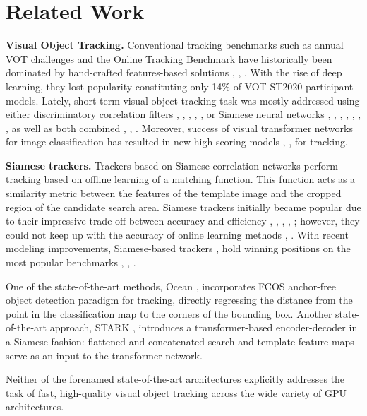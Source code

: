 \documentclass[runningheads]{llncs}
\begin{document}
\section{Related Work}
\textbf{Visual Object Tracking.}
Conventional tracking benchmarks such as annual VOT challenges \cite{VOT} and the Online Tracking Benchmark \cite{OTB} have historically been dominated by hand-crafted features-based solutions \cite{Matas}, \cite{KCF}, \cite{Staple}.
With the rise of deep learning, they lost popularity constituting only 14\% of VOT-ST2020 \cite{VOT2020} participant models.
Lately, short-term visual object tracking task \cite{VOT2020} was mostly addressed using either discriminatory correlation filters \cite{ECO}, \cite{DiMP}, \cite{ATOM}, \cite{DCFST}, \cite{LADCF}, \cite{AFOD} or Siamese neural networks \cite{Ocean}, \cite{SiamRPN}, \cite{SiamRPN++}, \cite{DaSiamRPN}, \cite{SiamFC++}, \cite{SiamDW}, \cite{GOTURN}, as well as both combined \cite{RPT}, \cite{OceanPlus}, \cite{AlphaRef}. 
Moreover, success  of visual transformer networks for image classification \cite{ViT} has resulted in new high-scoring models \cite{STARK}, \cite{TransT}, \cite{TrMeetsTr} for tracking.

\textbf{Siamese trackers.} 
Trackers based on Siamese correlation networks perform tracking based on offline learning of a matching function. 
This function acts as a similarity metric between the features of the template image and the cropped region of the candidate search area.
Siamese trackers initially became popular due to their impressive trade-off between accuracy and efficiency \cite{SINT}, \cite{SiamFC}, \cite{RASNet}, \cite{SiamRPN}, \cite{DaSiamRPN}; however, they could not keep up with the accuracy of online learning methods \cite{ATOM}, \cite{DiMP}. 
With recent modeling improvements, Siamese-based trackers \cite{STARK}, \cite{Ocean} hold winning positions on the most popular benchmarks \cite{VOT}, \cite{GOT10k}, \cite{LaSOT}.

One of the state-of-the-art methods, Ocean \cite{Ocean}, incorporates FCOS \cite{FCOS} anchor-free object detection paradigm for tracking, directly regressing the distance from the point in the classification map to the corners of the bounding box.
Another state-of-the-art approach, STARK \cite{STARK}, introduces a transformer-based encoder-decoder in a Siamese fashion: flattened and concatenated search and template feature maps serve as an input to the transformer network. 


Neither of the forenamed state-of-the-art architectures explicitly addresses the task of fast, high-quality visual object tracking across the wide variety of GPU architectures.
\end{document}
